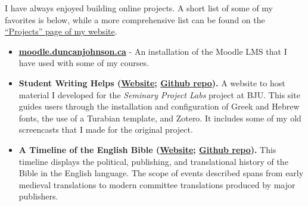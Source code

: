 
I have always enjoyed building online projects. A short list of some of my favorites is below, while a more comprehensive list can be found on the \href{http://duncanjohnson.ca/projects/}{``Projects'' page of my website}.

\begin{itemize}
\item \textbf{\href{http://moodle.duncanjohnson.ca/}{moodle.duncanjohnson.ca}} - An installation of the Moodle LMS that I have used with some of my courses.
\item \textbf{Student Writing Helps (\href{http://duncanjohnson.ca/Student-Writing-Helps/}{Website}; \href{https://github.com/dtjohnso/Student-Writing-Helps}{Github repo}).} A website to host material I developed for the \textit{Seminary Project Labs} project at BJU. This site guides users through the installation and configuration of Greek and Hebrew fonts, the use of a Turabian template, and Zotero. It includes some of my old screencasts that I made for the original project.
\item \textbf{A Timeline of the English Bible (\href{http://duncanjohnson.ca/English-Bible/}{Website}; \href{https://github.com/dtjohnso/English-Bible}{Github repo}).} This timeline displays the political, publishing, and translational history of the Bible in the English language. The scope of events described spans from early medieval translations to modern committee translations produced by major publishers.
\end{itemize}